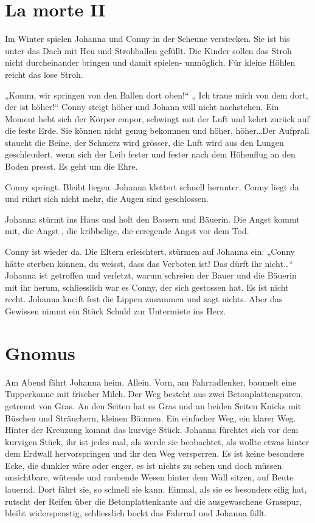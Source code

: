 \documentclass[10pt,titlepage,a5paper]{book}
\begin{document}
\section*{La morte II}



Im Winter spielen Johanna und Conny in der Scheune verstecken. Sie ist bis unter das Dach mit Heu und Strohballen gefüllt. Die Kinder sollen das Stroh nicht durcheinander bringen und damit spielen- unmöglich. Für kleine Höhlen reicht das lose Stroh.

„Komm, wir springen von den Ballen dort oben!“ „ Ich traue mich von dem dort, der ist höher!“ Conny steigt höher und Johann will nicht nachstehen. Ein Moment hebt sich der Körper empor, schwingt mit der Luft und kehrt zurück auf die feste Erde. Sie können nicht genug bekommen und höher, höher\dots Der Aufprall staucht die Beine, der Schmerz wird grösser, die Luft wird aus den Lungen geschleudert, wenn sich der Leib fester und fester nach dem Höhenflug an den Boden presst. Es geht um die Ehre.

Conny springt. Bleibt liegen. Johanna klettert schnell herunter. Conny liegt da und rührt sich nicht mehr, die Augen sind geschlossen.

Johanna stürmt ins Haus und holt den Bauern und Bäuerin. Die Angst kommt mit, die Angst , die kribbelige, die erregende Angst vor dem Tod.

Conny ist wieder da. Die Eltern erleichtert, stürmen auf Johanna ein: „Conny hätte sterben können, du weisst, dass das Verboten ist! Das dürft ihr nicht\dots“ Johanna ist getroffen und verletzt, warum schreien der Bauer und die Bäuerin mit ihr herum, schliesslich war es Conny, der sich gestossen hat. Es ist nicht recht. Johanna kneift fest die Lippen zusammen und sagt nichts. Aber das Gewissen nimmt ein Stück Schuld zur Untermiete ins Herz.



\section*{Gnomus}



Am Abend fährt Johanna heim. Allein. Vorn, am Fahrradlenker, baumelt eine Tupperkanne mit frischer Milch. Der Weg besteht aus zwei Betonplattenspuren, getrennt von Gras. An den Seiten hat es Gras und an beiden Seiten Knicks mit Büschen und Sträuchern, kleinen Bäumen. Ein einfacher Weg, ein klarer Weg. Hinter der Kreuzung kommt das kurvige Stück. Johanna fürchtet sich vor dem kurvigen Stück, ihr ist jedes mal, als werde sie beobachtet, als wollte etwas hinter dem Erdwall hervorspringen und ihr den Weg versperren. Es ist keine besondere Ecke, die dunkler wäre oder enger, es ist nichts zu sehen und doch müssen unsichtbare, wütende und raubende Wesen hinter dem Wall sitzen, auf Beute lauernd. Dort fährt sie, so schnell sie kann. Einmal, als sie es besonders eilig hat, rutscht der Reifen über die Betonplattenkante auf die ausgewaschene Grasspur, bleibt widerspenstig, schliesslich bockt das Fahrrad und Johanna fällt.
\end{document}
